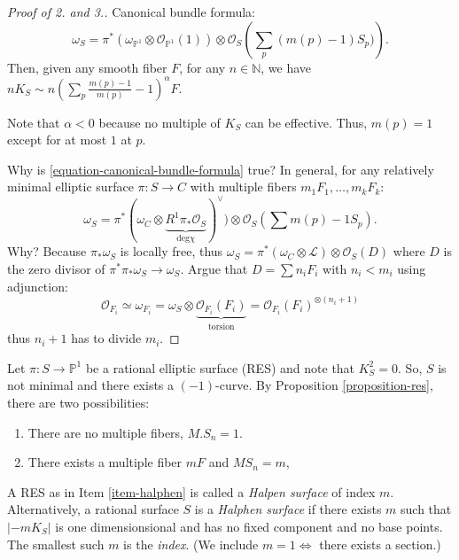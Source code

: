 \begin{proof}[Proof of 2. and 3.]
Canonical bundle formula:
\begin{equation}
\label{equation-canonical-bundle-formula}
\omega_S=\pi^*
(\omega_{\mathbb{P}^1}\otimes\mathcal{O}
_{\mathbb{P}^1}(1))
\otimes \mathcal{O}_S\left(
\sum_p(m(p)-1)S_p)\right).
\end{equation}
Then, given any smooth fiber $F$,
for any $n \in \mathbb{N}$,
we have $n K_S \sim n\left(\sum_p\frac{
m(p)-1}{m(p)}-1\right)^\alpha F$.

Note that $\alpha<0$ because no multiple
of $K_S$ can be effective.
Thus, $m(p)=1$ except for at most $1$ at $p$.

Why is
\ref{equation-canonical-bundle-formula}
true?
In general, for any relatively minimal
elliptic surface $\pi:S \to C$
with multiple fibers
$m_1F_1,…, m_k F_k$:
$$
\omega_S
=\pi^* (\omega_C \otimes
\underbrace{R^1\pi_*\mathcal{O}_S}
_{\text{deg}\chi})^\vee)
\otimes \mathcal{O}_S\left(\sum
m(p)-1S_p\right).
$$
Why? Because $\pi_*\omega_S$ is locally free,
thus $\omega_S=\pi^*(\omega_C \otimes
\mathcal{L})\otimes\mathcal{O}_S(D)$
where $D$ is the zero divisor
of $\pi^*\pi_*\omega_S\to \omega_S$.
Argue that $D=\sum n_iF_i$
with $n_i< m_i$ using adjunction:
$$
\mathcal{O}_{F_i}\simeq \omega_{F_i}
=\omega_S
\otimes\underbrace{\mathcal{O}_{F_i}(F_i)}
_{\text{torsion}}
=\mathcal{O}_{F_i}(F_i)^{\otimes (n_i+1)}
$$
thus $n_i+1$ has to divide $m_i$.
\end{proof}

\begin{remark}
\label{remark-rational-elliptic-surface}
Let $\pi:S \to \mathbb{P}^1$ be a rational
elliptic surface (RES)
and note that $K_S^2=0$.
So, $S$ is not minimal and there exists a
$(-1)$-curve.
By Proposition \ref{proposition-res},
there are two possibilities:
\begin{enumerate}
\item There are no multiple fibers,
$M.S_n=1$.
\label{item-no-multiple-fibers}

\item There exists a multiple fiber $mF$
\label{item-halphen}
and $MS_n=m$,
\end{enumerate}
\end{remark}

\begin{definition}
\label{definition-halphen-surface}
A RES as in Item \ref{item-halphen}
is called a {\it Halpen surface} of index
$m$.
Alternatively, a rational surface  $S$ is
a {\it Halphen surface} if there exists $m$
such that $|-m K_S|$ is one dimensionsional
and has no fixed component and no base
points.
The smallest such $m$ is the {\it index}.
(We include $m=1 \iff$ there exists a
section.)
\end{definition}

